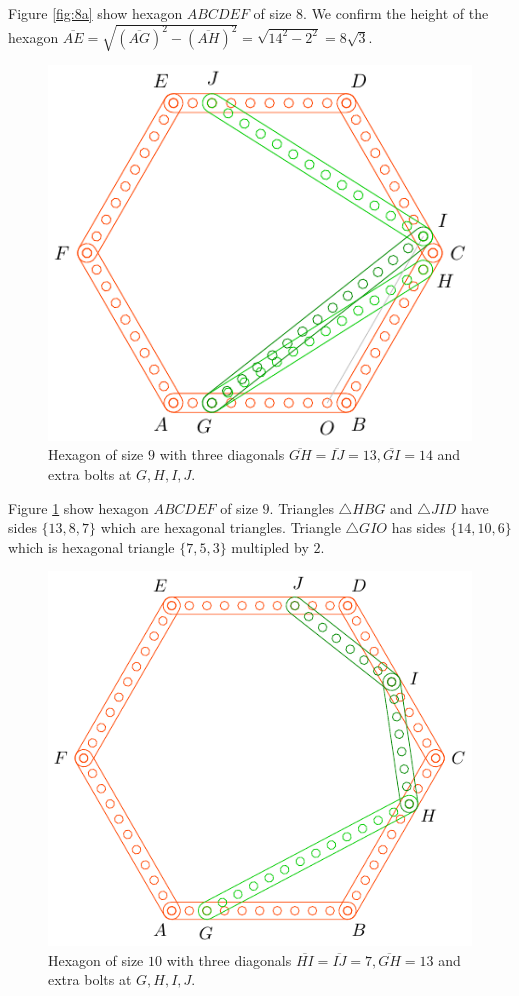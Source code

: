 \documentclass[11pt]{article}
\begin{document}
Figure \ref{fig:8a} show hexagon $ABCDEF$ of size $8$. We confirm the height of the hexagon $\overline{AE} = \sqrt{(\overline{AG})^2 - (\overline{AH})^2} = \sqrt{14^2 - 2^2} = 8\sqrt3$.


\begin{figure}[H]
\centering
\includegraphics[scale=1]{9/hexa-9a}
\caption{Hexagon of size $9$ with three diagonals $\overline{GH} = \overline{IJ} = 13, \overline{GI} = 14$ and extra bolts at $G,H,I,J$.}
\label{fig:9a}
\end{figure}

Figure \ref{fig:9a} show hexagon $ABCDEF$ of size $9$. Triangles $\triangle{HBG}$ and $\triangle{JID}$ have sides $\{13,8,7\}$ which are hexagonal triangles. Triangle $\triangle{GIO}$ has sides $\{14,10,6\}$ which is hexagonal triangle $\{7,5,3\}$ multipled by $2$.


\begin{figure}[H]
\centering
\includegraphics[scale=1]{10/hexa-10a}
\caption{Hexagon of size $10$ with three diagonals $\overline{HI} = \overline{IJ} = 7, \overline{GH} = 13$ and extra bolts at $G,H,I,J$.}
\label{fig:10a}
\end{figure}
\end{document}
